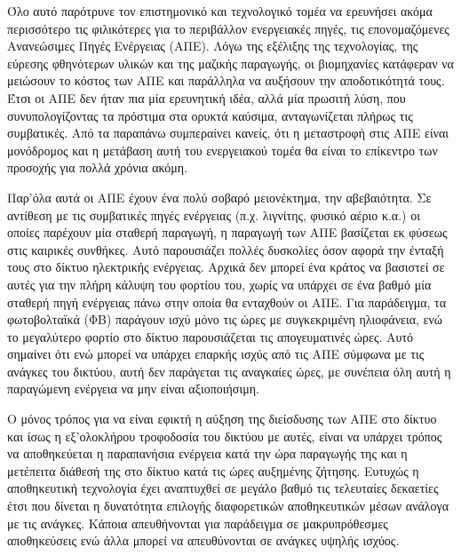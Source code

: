 \documentclass[12pt]{report}
\begin{document}
Όλο αυτό παρότρυνε τον επιστημονικό και τεχνολογικό τομέα να ερευνήσει ακόμα περισσότερο τις φιλικότερες για το περιβάλλον ενεργειακές πηγές, τις επονομαζόμενες 
Ανανεώσιμες Πηγές Ενέργειας (ΑΠΕ). Λόγω της εξέλιξης της τεχνολογίας, της εύρεσης φθηνότερων υλικών και της μαζικής παραγωγής, οι βιομηχανίες κατάφεραν να μειώσουν το κόστος των ΑΠΕ και παράλληλα να αυξήσουν την αποδοτικότητά τους.
Έτσι οι ΑΠΕ δεν ήταν πια μία ερευνητική ιδέα, αλλά μία πρωσιτή λύση, που συνυπολογίζοντας τα πρόστιμα στα ορυκτά καύσιμα, ανταγωνίζεται πλήρως τις συμβατικές. Από τα παραπάνω συμπεραίνει κανείς, ότι η μεταστροφή στις ΑΠΕ είναι 
μονόδρομος και η μετάβαση αυτή του ενεργειακού τομέα θα είναι το επίκεντρο των προσοχής για πολλά χρόνια ακόμη.

Παρ'όλα αυτά οι ΑΠΕ έχουν ένα πολύ σοβαρό μειονέκτημα, την αβεβαιότητα. Σε αντίθεση με τις συμβατικές πηγές ενέργειας (π.χ. λιγνίτης, φυσικό αέριο κ.α.) οι οποίες παρέχουν μία σταθερή παραγωγή, η παραγωγή των ΑΠΕ βασίζεται
εκ φύσεως στις καιρικές συνθήκες. Αυτό παρουσιάζει πολλές δυσκολίες όσον αφορά την ένταξή τους στο δίκτυο ηλεκτρικής ενέργειας. Αρχικά δεν μπορεί ένα κράτος να βασιστεί σε αυτές για την πλήρη κάλυψη του φορτίου του, χωρίς να υπάρχει
σε ένα βαθμό μία σταθερή πηγή ενέργειας πάνω στην οποία θα ενταχθούν οι ΑΠΕ. Για παράδειγμα, τα φωτοβολταϊκά (ΦΒ) παράγουν ισχύ μόνο τις ώρες με συγκεκριμένη ηλιοφάνεια, ενώ το μεγαλύτερο φορτίο στο δίκτυο παρουσιάζεται τις
απογευματινές ώρες. Αυτό σημαίνει ότι ενώ μπορεί να υπάρχει επαρκής ισχύς από τις ΑΠΕ σύμφωνα με τις ανάγκες του δικτύου, αυτή δεν παράγεται τις αναγκαίες ώρες, με συνέπεια όλη αυτή η παραγώμενη ενέργεια να μην είναι αξιοποιήσιμη. 

Ο μόνος τρόπος για να είναι εφικτή η αύξηση της διείσδυσης των ΑΠΕ στο δίκτυο και ίσως η εξ'ολοκλήρου τροφοδοσία του δικτύου με αυτές, είναι να υπάρχει τρόπος να αποθηκεύεται η παραπανήσια ενέργεια κατά την ώρα παραγωγής της και η 
μετέπειτα διάθεσή της στο δίκτυο κατά τις ώρες αυξημένης ζήτησης. Ευτυχώς η αποθηκευτική τεχνολογία έχει αναπτυχθεί σε μεγάλο βαθμό τις τελευταίες δεκαετίες έτσι που δίνεται η δυνατότητα επιλογής διαφορετικών 
αποθηκευτικών μέσων ανάλογα με τις ανάγκες. Κάποια απευθήνονται για παράδειγμα σε μακρυπρόθεσμες αποθηκεύσεις ενώ άλλα μπορεί να απευθύνονται σε ανάγκες υψηλής ισχύος. 
\end{document}
